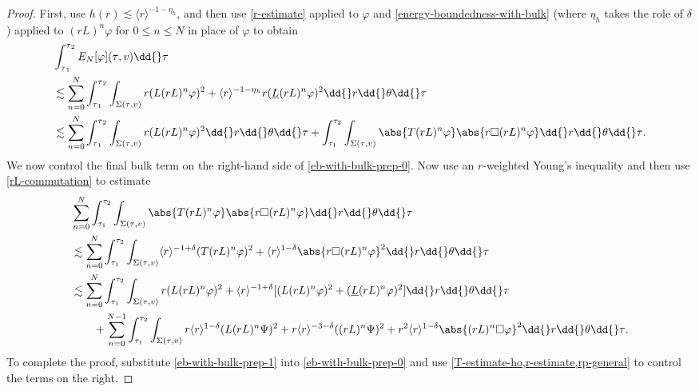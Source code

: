 \documentclass[10pt, reqno]{amsart}
\begin{document}
\begin{proof}
First, use \(h(r)\lesssim \langle{}r\rangle^{-1-\eta_h}\), and then use \cref{r-estimate} applied to
\(\varphi{}\) and \cref{energy-boundedness-with-bulk} (where \(\eta_h\) takes the
role of \(\delta{}\)) applied to \((rL)^n\varphi{}\) for \(0\le n\le N\) in place of \(\varphi{}\)
to obtain
\begin{equation}\label{eb-with-bulk-prep-0}
\begin{split}
&\int_{\tau{}_1}^{\tau{}_2} E_N[\varphi{}](\tau{},v)\dd{}\tau{} \\
&\lesssim \sum_{n=0}^N\int_{\tau{}_1}^{\tau{}_2} \int _{\Sigma{}(\tau{},v)}r(L(rL)^n\varphi{})^2 + \langle{}r\rangle^{-1-\eta{}_h}r(\underline{L}(rL)^n\varphi{})^2\dd{}r\dd{}\theta{}\dd{}\tau{} \\
&\lesssim \sum_{n=0}^N \int_{\tau{}_1}^{\tau{}_2}  \int _{\Sigma{}(\tau{},v)}r(L(rL)^n\varphi{})^2\dd{}r\dd{}\theta{}\dd{}\tau{} + \int_{\tau_1}^{\tau_{2}} \int _{\Sigma{}(\tau{},v)}\abs{T(rL)^n\varphi{}}\abs{r\Box{}(rL)^n\varphi{}}\dd{}r\dd{}\theta{}\dd{}\tau{}.
\end{split}
\end{equation}
We now control the final bulk term on the right-hand side of
\cref{eb-with-bulk-prep-0}. Now use an \(r\)-weighted Young's inequality and then use
\cref{rL-commutation} to estimate
\begin{equation}\label{eb-with-bulk-prep-1}
\begin{split}
&\sum_{n=0}^N\int_{\tau_1}^{\tau_{2}} \int _{\Sigma{}(\tau{},v)}\abs{T(rL)^n\varphi{}}\abs{r\Box{}(rL)^n\varphi{}}\dd{}r\dd{}\theta{}\dd{}\tau{}\\
&\lesssim \sum_{n=0}^N\int_{\tau_1}^{\tau_{2}} \int _{\Sigma{}(\tau{},v)}\langle{}r\rangle^{-1+\delta{}}(T(rL)^n\varphi{})^2 + \langle{}r\rangle^{1-\delta{}}\abs{r\Box{}(rL)^n\varphi{}}^2\dd{}r\dd{}\theta{}\dd{}\tau{}\\
&\lesssim \sum_{n=0}^N\int_{\tau_1}^{\tau_{2}} \int _{\Sigma{}(\tau{},v)} r(L(rL)^n\varphi{})^2 + \langle{}r\rangle^{-1+\delta{}}[(L(rL)^n\varphi{})^2 + (\underline{L}(rL)^n\varphi{})^2]\dd{}r\dd{}\theta{}\dd{}\tau{} \\
&\qquad +\sum_{n=0}^{N-1}\int_{\tau_1}^{\tau_{2}} \int _{\Sigma{}(\tau{},v)} r\langle{}r\rangle^{1-\delta{}}(L(rL)^n\Psi{})^2 + r\langle{}r\rangle^{-3-\delta{}}((rL)^n\Psi{})^2 + r^2\langle{}r\rangle^{1-\delta{}}\abs{(rL)^n\Box{}\varphi{}}^2\dd{}r\dd{}\theta{}\dd{}\tau{}.
\end{split}
\end{equation}
To complete the proof, substitute \cref{eb-with-bulk-prep-1} into
\cref{eb-with-bulk-prep-0} and use \cref{T-estimate-ho,r-estimate,rp-general} to
control the terms on the right.
\end{proof}
\end{document}
